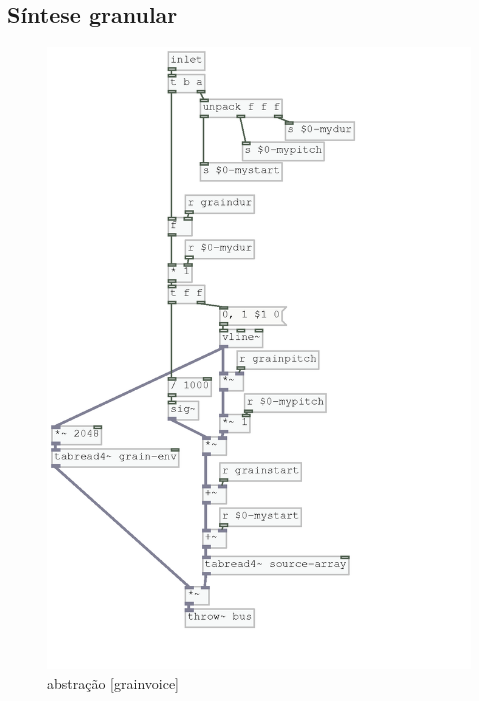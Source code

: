 \documentclass[draft]{ppgmus}
\begin{document}

\subsection{Síntese granular}




\begin{figure}
\includegraphics[scale=.6]{granular2}
\caption{abstração [grainvoice]}
\label{granular2}
\end{figure}
\end{document}
